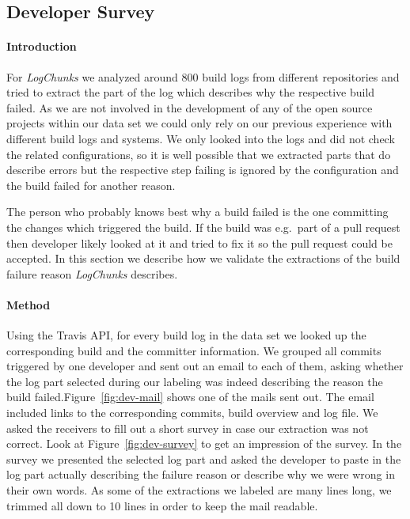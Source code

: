 \documentclass[\myrootdir/main.tex]{subfiles}
\begin{document}
\subsection{Developer Survey}

\paragraph{Introduction}
For \emph{LogChunks} we analyzed around 800 build logs from different repositories and tried to extract the part of the log which describes why the respective build failed.
As we are not involved in the development of any of the open source projects within our data set we could only rely on our previous experience with different build logs and systems.
We only looked into the logs and did not check the related configurations, so it is well possible that we extracted parts that do describe errors but the respective step failing is ignored by the configuration and the build failed for another reason.

The person who probably knows best why a build failed is the one committing the changes which triggered the build.
If the build was e.g.\ part of a pull request then developer likely looked at it and tried to fix it so the pull request could be accepted.
In this section we describe how we validate the extractions of the build failure reason \emph{LogChunks} describes.
\paragraph{Method}
Using the Travis API, for every build log in the data set we looked up the corresponding build and the committer information.
We grouped all commits triggered by one developer and sent out an email to each of them, asking whether the log part selected during our labeling was indeed describing the reason the build failed.Figure~\ref{fig:dev-mail} shows one of the mails sent out.
The email included links to the corresponding commits, build overview and log file.
We asked the receivers to fill out a short survey in case our extraction was not correct.
Look at Figure~\ref{fig:dev-survey} to get an impression of the survey.
In the survey we presented the selected log part and asked the developer to paste in the log part actually describing the failure reason or describe why we were wrong in their own words.
As some of the extractions we labeled are many lines long, we trimmed all down to 10 lines in order to keep the mail readable.
\end{document}
